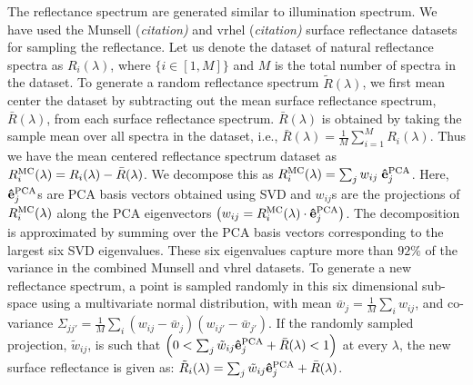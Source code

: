 \documentclass{jov}
\begin{document}
The reflectance spectrum are generated similar to illumination spectrum. 
We have used the Munsell {(\it citation)} and vrhel {(\it citation)} surface reflectance 
datasets for sampling the reflectance. Let us denote the dataset of natural 
reflectance spectra as $R_i(\lambda)$, where $\{i \in [1,M]\}$ 
and $M$ is the total number of spectra in the dataset. To generate 
a random reflectance spectrum $\tilde{R}(\lambda)$, 
we first mean center the dataset by subtracting out the 
mean surface reflectance spectrum, $\bar{R}(\lambda)$,
from each surface reflectance spectrum.
$\bar{R}(\lambda)$ is obtained by taking the sample 
mean over all spectra in the dataset, i.e.,
$\bar{R}(\lambda) = \frac{1}{M} \sum_{i=1}^M R_i(\lambda)$. 
Thus we have the mean centered reflectance 
spectrum dataset as $R_i^{\rm MC}(\lambda) =  R_i(\lambda)-\bar{R}(\lambda)$. 
We decompose this as $R_i^{\rm MC}(\lambda) = \sum_j{w_{ij} \; {\bf \hat{e}}_j^{\rm PCA}}$. Here,
${\bf \hat{e}}_j^{\rm PCA}$s are PCA basis vectors obtained using SVD 
and $w_{ij}$s are the projections of $R_i^{\rm MC}(\lambda)$ along the PCA eigenvectors 
$\left( w_{ij} = R_i^{\rm MC}(\lambda)\cdot {\bf \hat{e}}_j^{\rm PCA}\right)$. The 
decomposition is approximated by summing over the PCA basis 
vectors corresponding to the largest six SVD eigenvalues. These six eigenvalues capture 
more than $92\%$ of the variance in the combined Munsell and vhrel datasets. To generate 
a new reflectance spectrum, a point is sampled randomly in this 
six dimensional sub-space using a multivariate normal 
distribution, with mean $\bar{w}_j = \frac{1}{M}\sum_i w_{ij}$, 
and co-variance $\Sigma_{jj'} = \frac{1}{M} \sum_i \left(w_{ij} -\bar{w}_j\right)\left(w_{ij'} -\bar{w}_{j'}\right) $. If the randomly sampled projection, $\tilde{w}_{ij}$, is 
such that $\left( 0 < \sum_j \tilde{w}_{ij}{\bf \hat{e}}_j^{\rm PCA} + \bar{R}(\lambda)<1\right) $ at every $\lambda$, the new surface reflectance 
is given as: $\tilde{R}_i(\lambda) =\sum_j \tilde{w}_{ij}{\bf \hat{e}}_j^{\rm PCA} + \bar{R}(\lambda)$.
\end{document}
